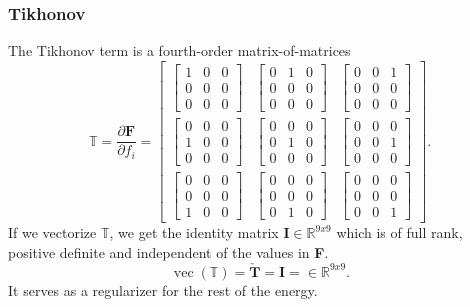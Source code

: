 \subsubsection{Tikhonov}
The Tikhonov term is a fourth-order matrix-of-matrices
\[
\mathbb{T} = \frac{\partial \mathbf{F}}{\partial f_i} = \left[\begin{array}{ccc}{\begin{bmatrix} 1 & 0 & 0 \\ 0 & 0 & 0 \\ 0 & 0 & 0 \end{bmatrix}} & {\begin{bmatrix} 0 & 1 & 0 \\ 0 & 0 & 0 \\ 0 & 0 & 0 \end{bmatrix}} & {\begin{bmatrix} 0 & 0 & 1 \\ 0 & 0 & 0 \\ 0 & 0 & 0 \end{bmatrix}} \\ {\begin{bmatrix} 0 & 0 & 0 \\ 1 & 0 & 0 \\ 0 & 0 & 0 \end{bmatrix}} & {\begin{bmatrix} 0 & 0 & 0 \\ 0 & 1 & 0 \\ 0 & 0 & 0 \end{bmatrix}} & {\begin{bmatrix} 0 & 0 & 0 \\ 0 & 0 & 1 \\ 0 & 0 & 0 \end{bmatrix}} \\ {\begin{bmatrix} 0 & 0 & 0 \\ 0 & 0 & 0 \\ 1 & 0 & 0 \end{bmatrix}} & {\begin{bmatrix} 0 & 0 & 0 \\ 0 & 0 & 0 \\ 0 & 1 & 0 \end{bmatrix}} & {\begin{bmatrix} 0 & 0 & 0 \\ 0 & 0 & 0 \\ 0 & 0 & 1 \end{bmatrix}} \end{array}\right].
\]
If we vectorize $\mathbb{T}$, we get the identity matrix $\mathbf{I} \in \mathbb{R}^{9x9}$ which is of full rank, positive definite and independent of the values in \textbf{F}. 
\[
\operatorname{vec}(\mathbb{T}) =  \mathbf{\check{T}} = \mathbf{I} = \in \mathbb{R}^{9x9}.
\]
It serves as a regularizer for the rest of the energy.


